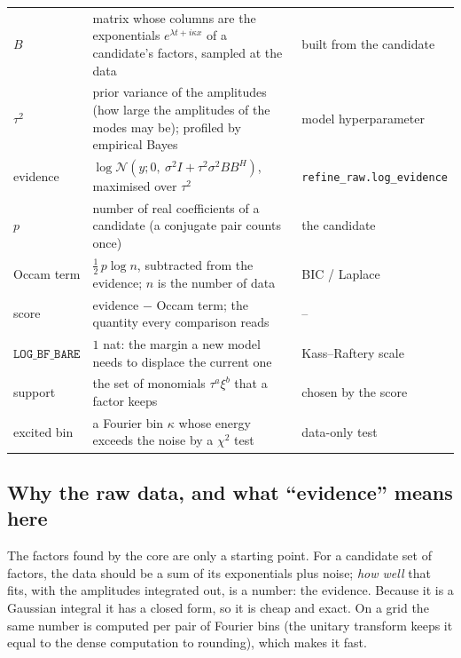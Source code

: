 \documentclass[11pt,a4paper]{article}
\theoremstyle{definition}
\begin{document}
\begin{symbols}
\begin{tabular}{@{}L{2.6cm}L{6.0cm}L{4.3cm}@{}}
$B$ & matrix whose columns are the exponentials $e^{\lambda t+i\kappa x}$ of a candidate's factors, sampled at the data & built from the candidate\\
$\tau^2$ & prior variance of the amplitudes (how large the amplitudes of the modes may be); profiled by empirical Bayes & model hyperparameter\\
evidence & $\log\mathcal N(y;0,\ \sigma^2I+\tau^2\sigma^2BB^{H})$, maximised over $\tau^2$ & \texttt{refine\_raw.}\allowbreak\texttt{log\_evidence}\\
$p$ & number of real coefficients of a candidate (a conjugate pair counts once) & the candidate\\
Occam term & $\tfrac12\,p\log n$, subtracted from the evidence; $n$ is the number of data & BIC / Laplace\\
score & evidence $-$ Occam term; the quantity every comparison reads & --\\
$\texttt{LOG\_BF\_BARE}$ & $1$ nat: the margin a new model needs to displace the current one & Kass--Raftery scale\\
support & the set of monomials $\tau^a\xi^b$ that a factor keeps & chosen by the score\\
excited bin & a Fourier bin $\kappa$ whose energy exceeds the noise by a $\chi^2$ test & data-only test\\
\end{tabular}
\end{symbols}

\subsection{Why the raw data, and what ``evidence'' means here}
The factors found by the core are only a starting point. For a candidate set of factors, the data should be a sum of its exponentials plus noise; \emph{how well} that fits, with the amplitudes integrated out, is a number: the evidence. Because it is a Gaussian integral it has a closed form, so it is cheap and exact. On a grid the same number is computed per pair of Fourier bins (the unitary transform keeps it equal to the dense computation to rounding), which makes it fast.
\end{document}
